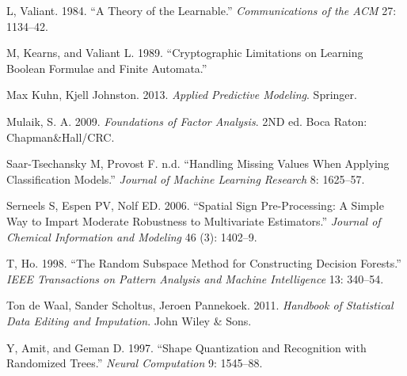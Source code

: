 \documentclass[
]{article}
\begin{document}
\leavevmode\hypertarget{ref-Valiant1984}{}%
L, Valiant. 1984. ``A Theory of the Learnable.'' \emph{Communications of
the ACM} 27: 1134--42.

\leavevmode\hypertarget{ref-KV1989}{}%
M, Kearns, and Valiant L. 1989. ``Cryptographic Limitations on Learning
Boolean Formulae and Finite Automata.''

\leavevmode\hypertarget{ref-APM}{}%
Max Kuhn, Kjell Johnston. 2013. \emph{Applied Predictive Modeling}.
Springer.

\leavevmode\hypertarget{ref-EFA1}{}%
Mulaik, S. A. 2009. \emph{Foundations of Factor Analysis}. 2ND ed. Boca
Raton: Chapman\&Hall/CRC.

\leavevmode\hypertarget{ref-missing1}{}%
Saar-Tsechansky M, Provost F. n.d. ``Handling Missing Values When
Applying Classification Models.'' \emph{Journal of Machine Learning
Research} 8: 1625--57.

\leavevmode\hypertarget{ref-ssp}{}%
Serneels S, Espen PV, Nolf ED. 2006. ``Spatial Sign Pre-Processing: A
Simple Way to Impart Moderate Robustness to Multivariate Estimators.''
\emph{Journal of Chemical Information and Modeling} 46 (3): 1402--9.

\leavevmode\hypertarget{ref-Ho1998}{}%
T, Ho. 1998. ``The Random Subspace Method for Constructing Decision
Forests.'' \emph{IEEE Transactions on Pattern Analysis and Machine
Intelligence} 13: 340--54.

\leavevmode\hypertarget{ref-impute1}{}%
Ton de Waal, Sander Scholtus, Jeroen Pannekoek. 2011. \emph{Handbook of
Statistical Data Editing and Imputation}. John Wiley \& Sons.

\leavevmode\hypertarget{ref-amit1997}{}%
Y, Amit, and Geman D. 1997. ``Shape Quantization and Recognition with
Randomized Trees.'' \emph{Neural Computation} 9: 1545--88.
\end{document}
